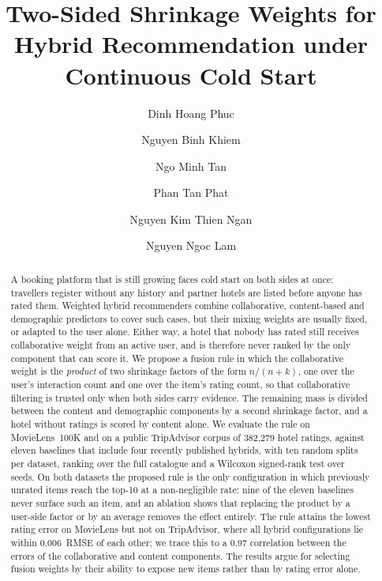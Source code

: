 \documentclass[runningheads]{llncs}
\begin{document}
\title{Two-Sided Shrinkage Weights for Hybrid Recommendation under Continuous Cold Start}

\author{Dinh Hoang Phuc \and Nguyen Binh Khiem \and Ngo Minh Tan \and
Phan Tan Phat \and Nguyen Kim Thien Ngan \and Nguyen Ngoc Lam}

\maketitle

\begin{abstract}
A booking platform that is still growing faces cold start on both sides at once: travellers register without any history and partner hotels are listed before anyone has rated them. Weighted hybrid recommenders combine collaborative, content-based and demographic predictors to cover such cases, but their mixing weights are usually fixed, or adapted to the user alone. Either way, a hotel that nobody has rated still receives collaborative weight from an active user, and is therefore never ranked by the only component that can score it. We propose a fusion rule in which the collaborative weight is the \emph{product} of two shrinkage factors of the form $n/(n+k)$, one over the user's interaction count and one over the item's rating count, so that collaborative filtering is trusted only when both sides carry evidence. The remaining mass is divided between the content and demographic components by a second shrinkage factor, and a hotel without ratings is scored by content alone. We evaluate the rule on MovieLens~100K and on a public TripAdvisor corpus of 382{,}279 hotel ratings, against eleven baselines that include four recently published hybrids, with ten random splits per dataset, ranking over the full catalogue and a Wilcoxon signed-rank test over seeds. On both datasets the proposed rule is the only configuration in which previously unrated items reach the top-10 at a non-negligible rate: nine of the eleven baselines never surface such an item, and an ablation shows that replacing the product by a user-side factor or by an average removes the effect entirely. The rule attains the lowest rating error on MovieLens but not on TripAdvisor, where all hybrid configurations lie within 0.006~RMSE of each other; we trace this to a 0.97 correlation between the errors of the collaborative and content components. The results argue for selecting fusion weights by their ability to expose new items rather than by rating error alone.

\end{abstract}
\end{document}
